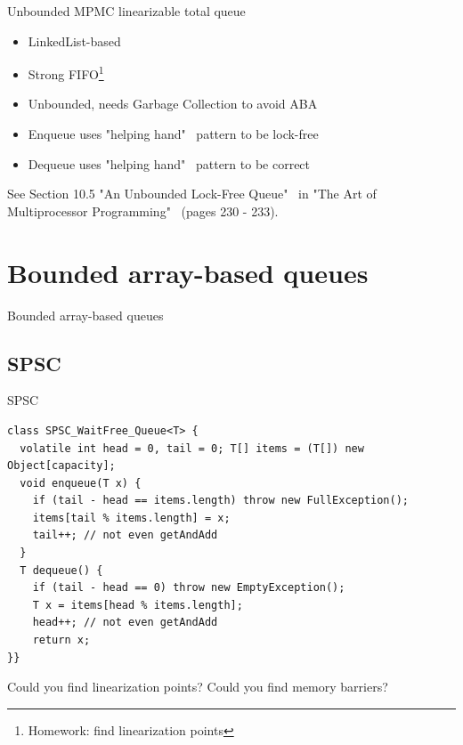 \begin{frame}{Unbounded MPMC linearizable total queue}

\begin{itemize}
  \item LinkedList-based
  \item Strong FIFO\footnote{Homework: find linearization points}
  \item Unbounded, needs Garbage Collection to avoid ABA
  \item Enqueue uses "helping hand" \ pattern to be lock-free
  \item Dequeue uses "helping hand" \ pattern to be correct
\end{itemize}

See Section 10.5 "An Unbounded Lock-Free Queue" \ in "The Art of Multiprocessor Programming" \ (pages 230 - 233).

\end{frame}


\section{Bounded array-based queues}
\showTOC

\begin{frame}{Bounded array-based queues}


\end{frame}

\subsection{SPSC}
\showTOCSub

\begin{frame}[fragile]{SPSC}

\begin{verbatim}
class SPSC_WaitFree_Queue<T> {
  volatile int head = 0, tail = 0; T[] items = (T[]) new Object[capacity];  
  void enqueue(T x) {
    if (tail - head == items.length) throw new FullException();
    items[tail % items.length] = x;
    tail++; // not even getAndAdd
  }
  T dequeue() {
    if (tail - head == 0) throw new EmptyException();
    T x = items[head % items.length];
    head++; // not even getAndAdd
    return x;
}}
\end{verbatim}

\pause Could you find linearization points? Could you find memory barriers?

\end{frame}

